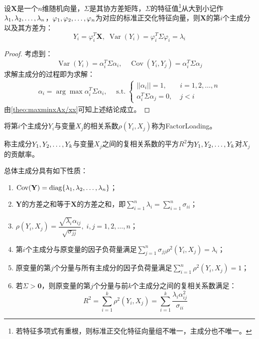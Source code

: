 \begin{theorem}\label{theo:PCA}
	设$\mathbf{X}$是一个$n$维随机向量，$\Sigma$是其协方差矩阵，$\Sigma$的特征值\footnote{若特征多项式有重根，则标准正交化特征向量组不唯一，主成分也不唯一。}从大到小记作$\lambda_1, \lambda_2, \dots, \lambda_{n}$，$\varphi_1, \varphi_2, \dots, \varphi_{n}$为对应的标准正交化特征向量，则$\mathbf{X}$的第$i$个主成分以及其方差为：
	\begin{equation*}
		Y_i=\varphi_i^T\mathbf{X},\;\operatorname{Var}(Y_i)=\varphi_i^T\Sigma\varphi_i=\lambda_i
	\end{equation*}
\end{theorem}
\begin{proof}
	考虑到：
	\begin{equation*}
		\operatorname{Var}(Y_i)=\alpha_i^T\Sigma\alpha_i,\quad
		\operatorname{Cov}(Y_i,Y_j)=\alpha_i^T\Sigma\alpha_j
	\end{equation*}
	求解主成分的过程即为求解：
	\begin{gather*}
		\alpha_i=\arg\max\alpha_i^T\Sigma\alpha_i,\quad
		\operatorname{s.t.}
		\begin{cases}
			||\alpha_i||=1,\;&i=1,2,\dots,n\\
			\alpha_i^T\Sigma\alpha_j=0,\;&j<i
		\end{cases}
	\end{gather*}
	由\cref{theo:maxminxAx/xx}可知上述结论成立。
\end{proof}
\begin{definition}
	将第$i$个主成分$Y_i$与变量$X_j$的相关系数$\rho(Y_i,X_j)$称为\gls{FactorLoading}。
\end{definition}
\begin{definition}
	称主成分$Y_1, Y_2, \dots, Y_{k}$与变量$X_j$之间的复相关系数的平方$R^2$为$Y_1, Y_2, \dots, Y_{k}$对$X_j$的贡献率。
\end{definition}
\begin{property}\label{prop:PCA}
	总体主成分具有如下性质：
	\begin{enumerate}
		\item $\operatorname{Cov}(\mathbf{Y})=\operatorname{diag}\{\lambda_1, \lambda_2, \dots, \lambda_{n}\}$；
		\item $\mathbf{Y}$的方差之和等于$\mathbf{X}$的方差之和，即$\sum\limits_{i=1}^{n}\lambda_i=\sum\limits_{i=1}^{n}\sigma_{ii}$；
		\item $\rho(Y_i,X_j)=\dfrac{\sqrt{\lambda_i}\alpha_{ij}}{\sqrt{\sigma_{jj}}},\;i,j=1,2,\dots,n$；
		\item 第$i$个主成分与原变量的因子负荷量满足$\sum\limits_{j=1}^{n}\sigma_{jj}\rho^2(Y_i,X_j)=\lambda_i$；
		\item 原变量的第$j$个分量与所有主成分的因子负荷量满足$\sum\limits_{i=1}^{n}\rho^2(Y_i,X_j)=1$；
		\item 若$\Sigma>\mathbf{0}$，则原变量的第$j$个分量与前$k$个主成分之间的复相关系数满足：
		\begin{equation*}
			R^2=\sum_{i=1}^{k}\rho^2(Y_i,X_j)=\sum_{i=1}^{k}\frac{\lambda_i\alpha_{ij}^2}{\sigma_{ii}}
		\end{equation*}
	\end{enumerate}
\end{property}
